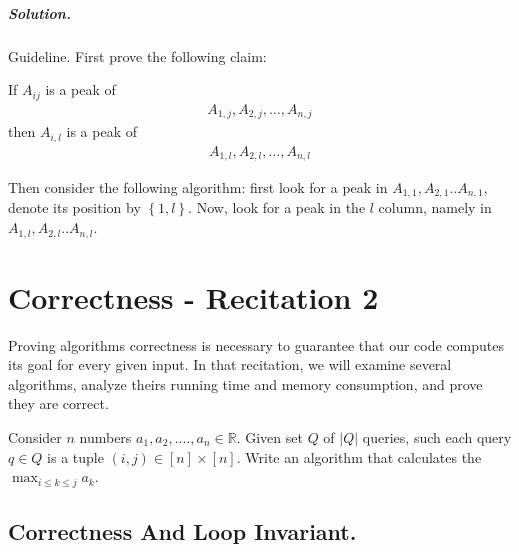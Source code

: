   \paragraph{Solution.} Guideline. First prove the following claim:  

  \begin{claim}
If $A_{ij}$ is a peak of 
\begin{equation*}
  \begin{split}
    A_{1,j}, A_{2,j}, \dots, A_{n,j}
  \end{split}
\end{equation*}
then $A_{i,l}$ is a peak of 
\begin{equation*}
  \begin{split}
    A_{1,l}, A_{2,l}, \dots, A_{n,l}
  \end{split}
\end{equation*}
  \end{claim}

Then consider the following algorithm: first look for a peak in $A_{1,1},A_{2,1}..A_{n,1}$, denote its position by $\left\{ 1,l \right\}$. Now, look for a peak in the $l$ column, namely in $A_{1,l},A_{2,l}..A_{n,l}$.
\fi 
\fi



    
\chapter{Correctness - Recitation 2} 
    Proving algorithms correctness is necessary to guarantee that our code computes its goal for every given input. In that recitation, we will examine several algorithms, analyze theirs running time and memory consumption, and prove they are correct.   


\begin{example}
Consider \(n\) numbers \(a_1,a_2,....,a_n \in \mathbb{R}\). Given set \(Q\) of \(|Q|\) queries, such each query \(q \in Q\) is a tuple \( (i,j) \in [n] \times [n] \). Write an algorithm that calculates the \(\max_{i\le k\le j}{a_k} \). 
\end{example}
\section{Correctness And Loop Invariant.}


